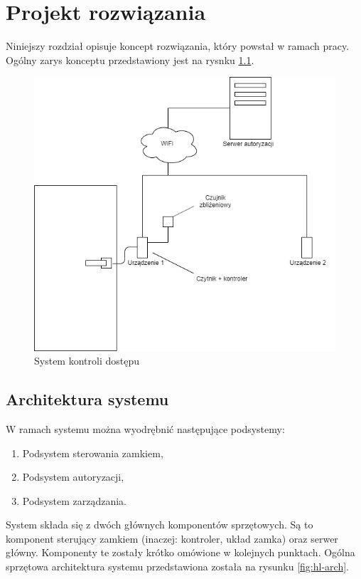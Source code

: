 \chapter{Projekt rozwiązania}
\label{chap:hl-arch}

Niniejszy rozdział opisuje koncept rozwiązania, który powstał w ramach pracy. Ogólny zarys konceptu przedstawiony jest na rysnku \ref{fig:door}.

\begin{figure}[]
        \includegraphics[width=\linewidth]{chapters/images/door.png}
        \caption{System kontroli dostępu}
        \label{fig:door}
\end{figure}

\section{Architektura systemu}
W ramach systemu można wyodrębnić następujące podsystemy:
\begin{enumerate}
        \item Podsystem sterowania zamkiem,
        \item Podsystem autoryzacji,
        \item Podsystem zarządzania.
\end{enumerate}

System składa się z dwóch głównych komponentów sprzętowych. Są to komponent sterujący zamkiem (inaczej: kontroler, układ zamka) oraz serwer główny. Komponenty te zostały krótko omówione w kolejnych punktach. Ogólna sprzętowa architektura systemu przedstawiona została na rysunku \ref{fig:hl-arch}.

